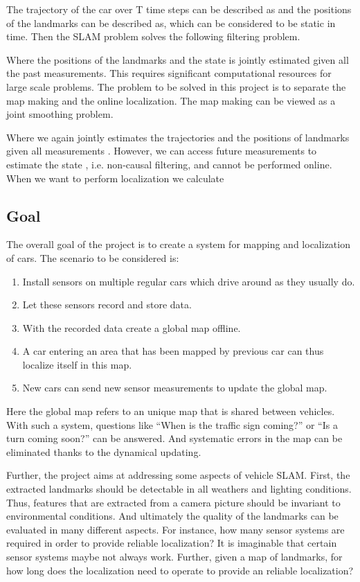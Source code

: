 The trajectory of the car over T time steps can be described as   and
the positions of the landmarks can be described as, which can be
considered to be static in time. Then the \gls{SLAM} problem solves
the following filtering problem.

Where the positions of the landmarks and the state is jointly
estimated given all the past measurements. This requires significant
computational resources for large scale problems. The problem to be
solved in this project is to separate the map making and the online
localization. The map making can be viewed as a joint smoothing
problem.


Where we again jointly estimates the trajectories  and the positions
of landmarks  given all measurements . However, we can access future
measurements to estimate the state , i.e. non-causal filtering, and
cannot be performed online. When we want to perform localization we
calculate


\subsection{Goal}

The overall goal of the project is to create a system for mapping and
localization of cars. The scenario to be considered is:
\begin{enumerate}
\item  Install sensors on multiple regular cars which drive around as
  they usually do.
\item Let these sensors record and store data.
\item With the recorded data create a global map offline.
\item A car entering an area that has been mapped by previous car can
  thus localize itself in this map.
\item New cars can send new sensor measurements to update the global
  map.
\end{enumerate}

Here the global map refers to an unique map that is shared between
vehicles. With such a system, questions like ``When is the traffic sign
coming?'' or  ``Is a turn coming soon?'' can be answered. And systematic
errors in the map can be eliminated thanks to the dynamical updating.

Further, the project aims at addressing some aspects of vehicle
\gls{SLAM}. First, the extracted landmarks should be detectable in all
weathers and lighting conditions. Thus, features that are extracted
from a camera picture should be invariant to environmental
conditions. And ultimately the quality of the landmarks can be
evaluated in many different aspects. For instance, how many sensor
systems are required in order to provide reliable localization? It is
imaginable that certain sensor systems maybe not always work. Further,
given a map of landmarks, for how long does the localization need to
operate to provide an reliable localization?

